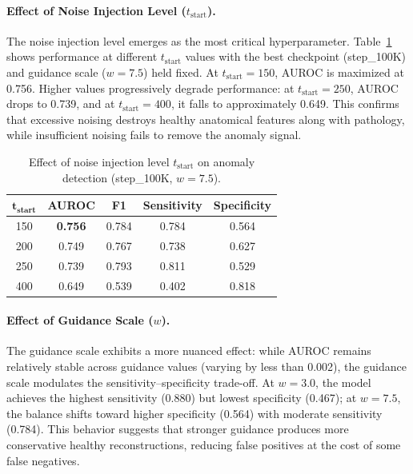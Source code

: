 \paragraph{Effect of Noise Injection Level ($t_{\text{start}}$).} The noise injection level emerges as the most critical hyperparameter. Table~\ref{tab:tstart_effect} shows performance at different $t_{\text{start}}$ values with the best checkpoint (step\_100K) and guidance scale ($w = 7.5$) held fixed. At $t_{\text{start}} = 150$, AUROC is maximized at 0.756. Higher values progressively degrade performance: at $t_{\text{start}} = 250$, AUROC drops to 0.739, and at $t_{\text{start}} = 400$, it falls to approximately 0.649. This confirms that excessive noising destroys healthy anatomical features along with pathology, while insufficient noising fails to remove the anomaly signal.

\begin{table}[H]
\centering
\caption{Effect of noise injection level $t_{\text{start}}$ on anomaly detection (step\_100K, $w = 7.5$).}
\label{tab:tstart_effect}
\begin{tabular}{@{}ccccc@{}}
\toprule
$\boldsymbol{t_{\textbf{start}}}$ & \textbf{AUROC} & \textbf{F1} & \textbf{Sensitivity} & \textbf{Specificity} \\
\midrule
150  & \textbf{0.756} & 0.784 & 0.784 & 0.564 \\
200  & 0.749 & 0.767 & 0.738 & 0.627 \\
250  & 0.739 & 0.793 & 0.811 & 0.529 \\
400  & 0.649 & 0.539 & 0.402 & 0.818 \\
\bottomrule
\end{tabular}
\end{table}

\paragraph{Effect of Guidance Scale ($w$).} The guidance scale exhibits a more nuanced effect: while AUROC remains relatively stable across guidance values (varying by less than 0.002), the guidance scale modulates the sensitivity--specificity trade-off. At $w = 3.0$, the model achieves the highest sensitivity (0.880) but lowest specificity (0.467); at $w = 7.5$, the balance shifts toward higher specificity (0.564) with moderate sensitivity (0.784). This behavior suggests that stronger guidance produces more conservative healthy reconstructions, reducing false positives at the cost of some false negatives.

